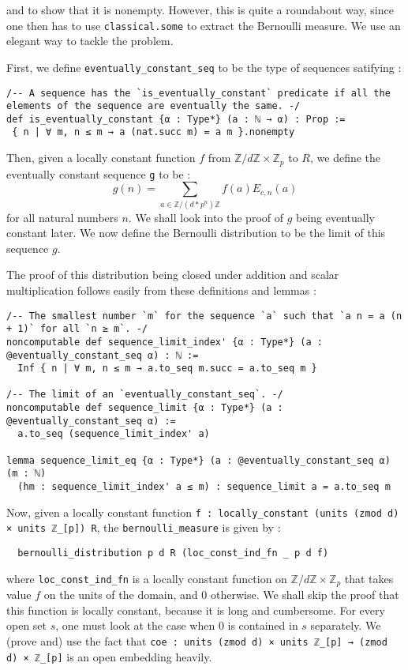 \documentclass[a4paper,UKenglish,cleveref, autoref, thm-restate]{lipics-v2021}
\newcommand{\lean}[1]{\texttt{#1}\xspace} %
\begin{document}
and to show that it is nonempty. However, this is quite a roundabout way, since one then has to use 
\lean{classical.some} to extract the Bernoulli measure. We use an elegant way to tackle the problem. 

First, we define \lean{eventually\_constant\_seq} to be the type of sequences satifying : 
\begin{lstlisting}
/-- A sequence has the `is_eventually_constant` predicate if all the elements of the sequence are eventually the same. -/
def is_eventually_constant {α : Type*} (a : ℕ → α) : Prop :=
 { n | ∀ m, n ≤ m → a (nat.succ m) = a m }.nonempty
\end{lstlisting}

Then, given a locally constant function $f$ from $\mathbb{Z}/d \mathbb{Z} \times \mathbb{Z}_p$ to $R$, 
we define the eventually constant sequence \lean{g} to be : 
$$ g(n) = \sum_{a \in \mathbb{Z}/(d*p^n) \mathbb{Z}} f(a) E_{c, n}(a) $$ 
for all natural numbers $n$. We shall look into the proof of $g$ being eventually constant later. We now define the Bernoulli 
distribution to be the limit of this sequence $g$. 

The proof of this distribution being closed under addition and scalar multiplication follows easily from these definitions and lemmas : 
\begin{lstlisting}
/-- The smallest number `m` for the sequence `a` such that `a n = a (n + 1)` for all `n ≥ m`. -/
noncomputable def sequence_limit_index' {α : Type*} (a : @eventually_constant_seq α) : ℕ :=
  Inf { n | ∀ m, n ≤ m → a.to_seq m.succ = a.to_seq m }

/-- The limit of an `eventually_constant_seq`. -/
noncomputable def sequence_limit {α : Type*} (a : @eventually_constant_seq α) :=
  a.to_seq (sequence_limit_index' a)

lemma sequence_limit_eq {α : Type*} (a : @eventually_constant_seq α) (m : ℕ)
  (hm : sequence_limit_index' a ≤ m) : sequence_limit a = a.to_seq m
\end{lstlisting}

Now, given a locally constant function \lean{f : locally\_constant (units (zmod d) × units ℤ\_[p]) R}, 
the \lean{bernoulli\_measure} is given by : 
\begin{lstlisting}
  bernoulli_distribution p d R (loc_const_ind_fn _ p d f)
\end{lstlisting}
where \lean{loc\_const\_ind\_fn} is a locally constant function on $\mathbb{Z}/d \mathbb{Z} \times \mathbb{Z}_p$ 
that takes value $f$ on the units of the domain, and 0 otherwise. We shall skip the proof that this function is 
locally constant, because it is long and cumbersome. For every open set $s$, one must look at the case when 0 is 
contained in $s$ separately. We (prove and) use the fact that \lean{coe : units (zmod d) × units ℤ\_[p] → (zmod d) × ℤ\_[p]} 
is an open embedding heavily. 
\end{document}
